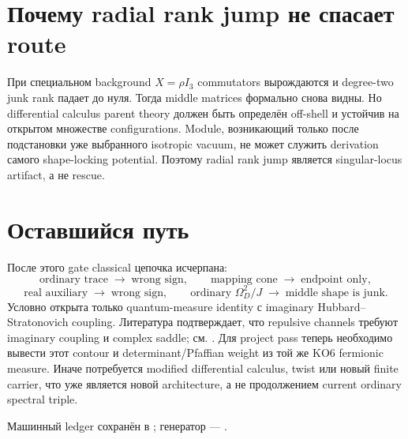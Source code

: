 \section{Почему radial rank jump не спасает route}

При специальном background \(X=\rho I_3\) commutators вырождаются и
degree-two junk rank падает до нуля. Тогда middle matrices формально снова
видны. Но differential calculus parent theory должен быть определён
off-shell и устойчив на открытом множестве configurations. Module,
возникающий только после подстановки уже выбранного isotropic vacuum, не
может служить derivation самого shape-locking potential. Поэтому radial
rank jump является singular-locus artifact, а не rescue.

\section{Оставшийся путь}

После этого gate classical цепочка исчерпана:
\begin{equation}
 \text{ordinary trace}
 \;\longrightarrow\;\text{wrong sign},
 \qquad
 \text{mapping cone}
 \;\longrightarrow\;\text{endpoint only},
\end{equation}
\begin{equation}
 \text{real auxiliary}
 \;\longrightarrow\;\text{wrong sign},
 \qquad
 \text{ordinary }\Omega_D^2/J
 \;\longrightarrow\;\text{middle shape is junk}.
\end{equation}
Условно открыта только quantum-measure identity с imaginary
Hubbard--Stratonovich coupling. Литература подтверждает, что repulsive
channels требуют imaginary coupling и complex saddle; см.
. Для project pass теперь необходимо вывести этот
contour и determinant/Pfaffian weight из той же KO6 fermionic measure.
Иначе потребуется modified differential calculus, twist или новый finite
carrier, что уже является новой architecture, а не продолжением current
ordinary spectral triple.

Машинный ledger сохранён в
; генератор ---
.